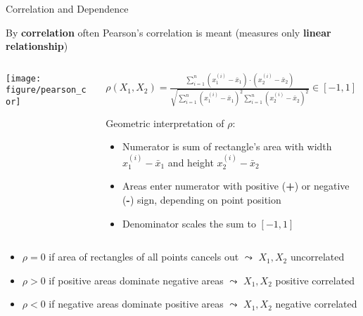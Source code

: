 \documentclass[11pt,compress,t,notes=noshow, aspectratio=169, xcolor=table]{beamer}
\begin{document}
\begin{frame}{Correlation and Dependence}

By \textbf{correlation} often Pearson's correlation is meant (measures only \textbf{linear relationship}) %




\begin{columns}[c, totalwidth=\textwidth]
\begin{column}{0.5\linewidth}
\texttt{[image: figure/pearson\_cor]}
\end{column}
\begin{column}{0.5\linewidth}

\centerline{$\rho(X_1, X_2) = \tfrac{\sum_{i=1}^{n}{(x_1^{(i)}-\bar{x}_1) \cdot (x_2^{(i)}-\bar{x}_2)}}{\sqrt{\sum_{i=1}^{n}{(x_1^{(i)}-\bar{x}_1)^2 \sum_{i=1}^{n}{(x_2^{(i)}-\bar{x}_2)^2 }}}} \in [-1, 1]$}

\medskip

Geometric interpretation of $\rho$:
\begin{itemize}
    \item Numerator is sum of rectangle's area with width $x_1^{(i)}-\bar{x}_1$ and height $x_2^{(i)}-\bar{x}_2$
    \item Areas enter numerator with positive (\textbf{+}) or negative (\textbf{-}) sign, depending on point position
    \item Denominator scales the sum to $ [-1, 1]$
\end{itemize}
\end{column}
\end{columns}

\medskip
\pause
\begin{itemize}
    \item $\rho = 0$ if area of rectangles of all points cancels out
    $\leadsto$ $X_1, X_2$ uncorrelated
    \item $\rho > 0$ if {\color{ggblue}positive areas} dominate {\color{ggred}negative areas} 
    $\leadsto$ $X_1, X_2$ positive correlated
    \item $\rho < 0$ if {\color{ggred}negative areas} dominate {\color{ggblue}positive areas} 
    $\leadsto$ $X_1, X_2$ negative correlated
\end{itemize}

\end{frame}
\end{document}
